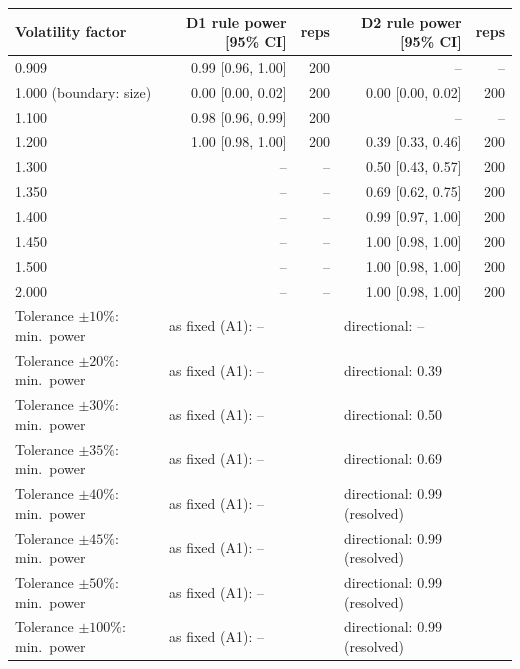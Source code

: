 \begin{tabular}{lrrrr}
\toprule
Volatility factor & D1 rule power [95\% CI] & reps & D2 rule power [95\% CI] & reps \\
\midrule
0.909 & 0.99 [0.96, 1.00] & 200 & -- & -- \\
1.000 (boundary: size) & 0.00 [0.00, 0.02] & 200 & 0.00 [0.00, 0.02] & 200 \\
1.100 & 0.98 [0.96, 0.99] & 200 & -- & -- \\
1.200 & 1.00 [0.98, 1.00] & 200 & 0.39 [0.33, 0.46] & 200 \\
1.300 & -- & -- & 0.50 [0.43, 0.57] & 200 \\
1.350 & -- & -- & 0.69 [0.62, 0.75] & 200 \\
1.400 & -- & -- & 0.99 [0.97, 1.00] & 200 \\
1.450 & -- & -- & 1.00 [0.98, 1.00] & 200 \\
1.500 & -- & -- & 1.00 [0.98, 1.00] & 200 \\
2.000 & -- & -- & 1.00 [0.98, 1.00] & 200 \\
\midrule
Tolerance $\pm10\%$: min.\ power & \multicolumn{2}{l}{as fixed (A1): --} & \multicolumn{2}{l}{directional: --} \\
Tolerance $\pm20\%$: min.\ power & \multicolumn{2}{l}{as fixed (A1): --} & \multicolumn{2}{l}{directional: 0.39} \\
Tolerance $\pm30\%$: min.\ power & \multicolumn{2}{l}{as fixed (A1): --} & \multicolumn{2}{l}{directional: 0.50} \\
Tolerance $\pm35\%$: min.\ power & \multicolumn{2}{l}{as fixed (A1): --} & \multicolumn{2}{l}{directional: 0.69} \\
Tolerance $\pm40\%$: min.\ power & \multicolumn{2}{l}{as fixed (A1): --} & \multicolumn{2}{l}{directional: 0.99 (resolved)} \\
Tolerance $\pm45\%$: min.\ power & \multicolumn{2}{l}{as fixed (A1): --} & \multicolumn{2}{l}{directional: 0.99 (resolved)} \\
Tolerance $\pm50\%$: min.\ power & \multicolumn{2}{l}{as fixed (A1): --} & \multicolumn{2}{l}{directional: 0.99 (resolved)} \\
Tolerance $\pm100\%$: min.\ power & \multicolumn{2}{l}{as fixed (A1): --} & \multicolumn{2}{l}{directional: 0.99 (resolved)} \\
\bottomrule
\end{tabular}
